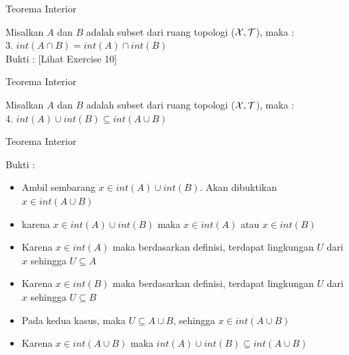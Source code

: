 \begin{frame}{Teorema Interior}
    \begin{tcolorbox}[enhanced,title=Teorema 1.24, frame style tile={width=\paperwidth}{\wallpaper}]
        Misalkan $A$ dan $B$ adalah subset dari ruang topologi ($\mathcal{X}, \mathcal{T}$), maka : \\
        3. $int(A \cap B) = int(A) \cap int(B)$ \\

        Bukti : [Lihat Exercise 10]
        
    \end{tcolorbox}
\end{frame}

\begin{frame}{Teorema Interior}
    \begin{tcolorbox}[enhanced,title=Teorema 1.24, frame style tile={width=\paperwidth}{\wallpaper}]
        Misalkan $A$ dan $B$ adalah subset dari ruang topologi ($\mathcal{X}, \mathcal{T}$), maka : \\
        4. $int(A) \cup int(B) \subseteq int(A \cup B)$
    \end{tcolorbox}
\end{frame}

\begin{frame}{Teorema Interior}
    \begin{tcolorbox}[enhanced,title=Teorema 1.24, frame style tile={width=\paperwidth}{\wallpaper}]
        Bukti :
        \begin{itemize}
            \item Ambil sembarang $x \in int(A) \cup int(B)$. Akan dibuktikan $x \in int(A \cup B)$
            \item karena $x \in int(A) \cup int(B)$ maka $x \in int(A)$ atau $x \in int(B)$
            \item Karena $x \in int(A)$ maka berdasarkan definisi, terdapat lingkungan $U$ dari $x$ sehingga $U \subseteq A$
            \item Karena $x \in int(B)$ maka berdasarkan definisi, terdapat lingkungan $U$ dari $x$ sehingga $U \subseteq B$
            \item Pada kedua kasus, maka $U \subseteq A \cup B$, sehingga $x \in int(A \cup B)$ 
            \item Karena $x \in int(A \cup B)$ maka $int(A) \cup int(B) \subseteq int(A \cup B)$
        \end{itemize}
        
    \end{tcolorbox}
\end{frame}

